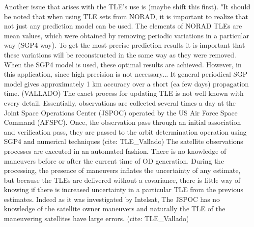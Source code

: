 Another issue that arises with the TLE's use is (maybe shift this first).
"It should be noted that when using TLE sets from NORAD, it is important to realize that not just any prediction model can be used. The elements of NORAD TLEs are mean values, which were obtained by removing periodic variations in a particular way (SGP4 way). To get the most precise prediction results it is important that these variations will be reconstructed in the same way as they were removed. When the SGP4 model is used, these optimal results are achieved. However, in this application, since high precision is not necessary... It general periodical SGP model gives approximately 1 km accuracy over a short (ca few days) propagation time. (VALLADO)
The exact process for updating TLE is not well known with every detail. Essentially, observations are collected several times a day at the Joint Space Operations Center (JSPOC) operated by the US Air Force Space Command (AFSPC). Once, the observation pass through an initial association and verification pass, they are passed to the orbit determination operation using SGP4 and numerical techniques (cite: TLE_Vallado)
The satellite observations processes are executed in an automated fashion. There is no knowledge of maneuvers before or after the current time of OD generation. During the processing, the presence of maneuvers inflates the uncertainty of any estimate, but because the TLEs are delivered without a covariance, there is little way of knowing if there is increased uncertainty in a particular TLE from the previous estimates. Indeed as it was investigated by Intelsat, The JSPOC has no knowledge of the satellite owner maneuvers and naturally the TLE of the maneuvering satellites have large errors. (cite: TLE_Vallado)



%

